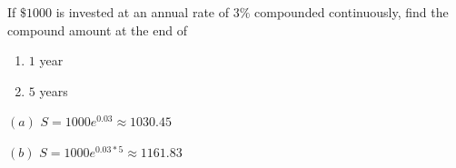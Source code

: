 \begin{example}
    If \(\$1000\) is invested at an annual rate of \(3\%\) compounded continuously, find the compound amount at the end of
    \begin{enumerate}
        \item \(1\) year
        \item \(5\) years
    \end{enumerate}
    \begin{solution}
        \((a)\) \(S = 1000e^{0.03} \approx 1030.45\)

        \((b)\) \(S = 1000e^{0.03*5} \approx 1161.83\)
    \end{solution}
\end{example}